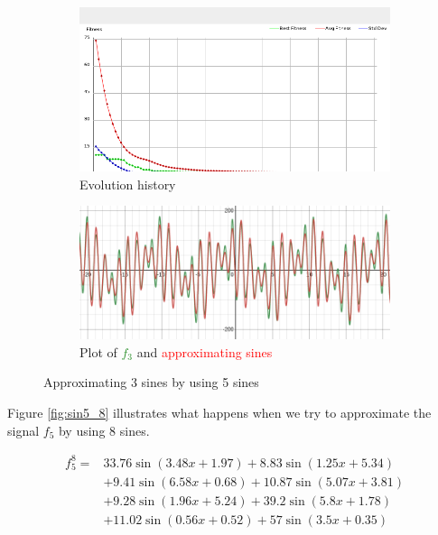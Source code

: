 \documentclass[conference]{IEEEtran}
\begin{document}
\begin{figure}[h]
\centering
\begin{subfigure}{.8\linewidth}
  \centering
  \includegraphics[width=.9\linewidth]{img/sin3_5_new.png}
  \caption{Evolution history}
  \label{fig:hist_sin3_5}
\end{subfigure}

\begin{subfigure}{.8\linewidth}
  \centering
  \includegraphics[width=.9\linewidth]{img/plot_sin5_3.png}
  \caption{Plot of \textcolor{ForestGreen}{$f_3$} and \textcolor{red}{approximating sines}}
  \label{fig:plot_sin3_5}
\end{subfigure}
\caption{Approximating 3 sines by using 5 sines}
\label{fig:sin3_5}
\end{figure}

Figure \ref{fig:sin5_8} illustrates what happens when we try to approximate the signal $f_5$ by using 8 sines.

\begin{equation}
	\begin{split}
		f_5^8 =& 33.76\sin(3.48x+1.97) + 8.83\sin(1.25x+5.34) \\
			&+ 9.41\sin(6.58x+0.68) + 10.87\sin(5.07x+3.81) \\
			&+ 9.28\sin(1.96x+5.24) + 39.2\sin(5.8x+1.78) \\
			&+ 11.02\sin(0.56x+0.52) + 57\sin(3.5x+0.35)
	\end{split}
	\label{eq:f5_8}
\end{equation}
\end{document}
